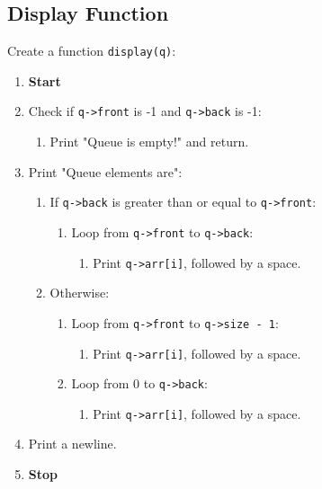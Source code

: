 {  \subsection{Display Function}
  Create a function \texttt{display(q)}:
  \begin{enumerate}[label=\arabic*:,left=0pt]
    \item \textbf{Start}
    \item Check if \texttt{q->front} is -1 and \texttt{q->back} is -1:
          \begin{enumerate}[label=2.\arabic*.]
            \item Print "Queue is empty!" and return.
          \end{enumerate}
    \item Print "Queue elements are":
          \begin{enumerate}[label=2.\arabic*.]
            \item If \texttt{q->back} is greater than or equal to \texttt{q->front}:
                  \begin{enumerate}[label=3.\arabic*.]
                    \item Loop from \texttt{q->front} to \texttt{q->back}:
                          \begin{enumerate}[label=4.\arabic*.]
                            \item Print \texttt{q->arr[i]}, followed by a space.
                          \end{enumerate}
                  \end{enumerate}
            \item Otherwise:
                  \begin{enumerate}[label=3.\arabic*.]
                    \item Loop from \texttt{q->front} to \texttt{q->size - 1}:
                          \begin{enumerate}[label=4.\arabic*.]
                            \item Print \texttt{q->arr[i]}, followed by a space.
                          \end{enumerate}
                    \item Loop from 0 to \texttt{q->back}:
                          \begin{enumerate}[label=4.\arabic*.]
                            \item Print \texttt{q->arr[i]}, followed by a space.
                          \end{enumerate}
                  \end{enumerate}
          \end{enumerate}
    \item Print a newline.
    \item \textbf{Stop}
  \end{enumerate}

}
